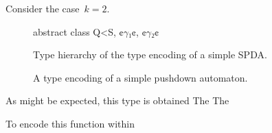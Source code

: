 Consider the case~$k=2$.
\begin{figure}
  \begin{JAVA}
abstract class Q<S, ¢$γ₁$¢, ¢$γ₂$¢
  \end{JAVA}
\end{figure}

\begin{figure}
  \caption{\label{Figure:SPDA:hierarchy}%
    Type hierarchy of the type encoding of a simple SPDA.
  }
  \begin{adjustbox}{}
    
  \end{adjustbox}
\end{figure}

\begin{figure}
  \caption{\label{Figure:SPDA:example}%
    A type encoding of a simple pushdown automaton.
  }
\end{figure}
As might be expected, this type is obtained
The
The

To encode this function within
